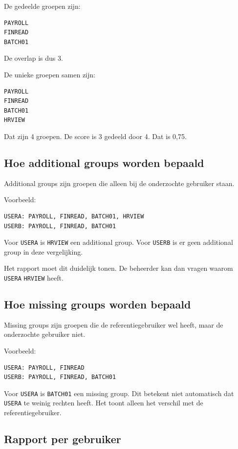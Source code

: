 De gedeelde groepen zijn:

\begin{verbatim}
PAYROLL
FINREAD
BATCH01
\end{verbatim}

De overlap is dus 3.

De unieke groepen samen zijn:

\begin{verbatim}
PAYROLL
FINREAD
BATCH01
HRVIEW
\end{verbatim}

Dat zijn 4 groepen. De score is 3 gedeeld door 4. Dat is 0,75.

\subsection*{Hoe additional groups worden bepaald}

Additional groups zijn groepen die alleen bij de onderzochte gebruiker staan.

Voorbeeld:

\begin{verbatim}
USERA: PAYROLL, FINREAD, BATCH01, HRVIEW
USERB: PAYROLL, FINREAD, BATCH01
\end{verbatim}

Voor \texttt{USERA} is \texttt{HRVIEW} een additional group. Voor \texttt{USERB} is er geen additional group in deze vergelijking.

Het rapport moet dit duidelijk tonen. De beheerder kan dan vragen waarom \texttt{USERA} \texttt{HRVIEW} heeft.

\subsection*{Hoe missing groups worden bepaald}

Missing groups zijn groepen die de referentiegebruiker wel heeft, maar de onderzochte gebruiker niet.

Voorbeeld:

\begin{verbatim}
USERA: PAYROLL, FINREAD
USERB: PAYROLL, FINREAD, BATCH01
\end{verbatim}

Voor \texttt{USERA} is \texttt{BATCH01} een missing group. Dit betekent niet automatisch dat \texttt{USERA} te weinig rechten heeft. Het toont alleen het verschil met de referentiegebruiker.

\subsection*{Rapport per gebruiker}

